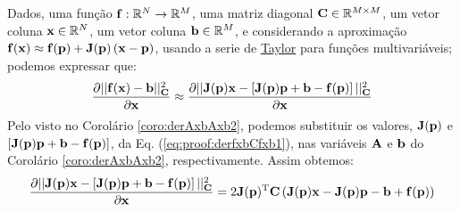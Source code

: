 \begin{myproofT}\label{proof:theo:derfxbCfxb}
Dados,
uma função $\VECTOR{f}:\mathbb{R}^{N} \rightarrow \mathbb{R}^{M}$, 
uma matriz diagonal $\MATRIX{C}\in \mathbb{R}^{M\times M}$, 
um vetor coluna $\VECTOR{x}\in \mathbb{R}^{N}$, 
um vetor coluna $\VECTOR{b}\in \mathbb{R}^{M}$, 
e considerando a aproximação
$\VECTOR{f}(\VECTOR{x})\approx \VECTOR{f}(\VECTOR{p})+\MATRIX{J}(\VECTOR{p})\left(\VECTOR{x}-\VECTOR{p}\right)$,
usando a serie de \hyperref[def:taylor]{Taylor} para funções multivariáveis;
podemos expressar que:
\begin{equation}\label{eq:proof:derfxbCfxb1}
\frac{\partial ||\VECTOR{f}(\VECTOR{x})-\VECTOR{b}||_{\MATRIX{C}}^2}{\partial \VECTOR{x}} \approx
\frac{\partial ||\MATRIX{J}(\VECTOR{p})\VECTOR{x}-\left[\MATRIX{J}(\VECTOR{p})\VECTOR{p}+\VECTOR{b}-\VECTOR{f}(\VECTOR{p})\right]||_{\MATRIX{C}}^2}{\partial \VECTOR{x}}
\end{equation}
Pelo visto no Corolário \ref{coro:derAxbAxb2}, podemos substituir os valores,
$\MATRIX{J}(\VECTOR{p})$ e 
$\left[\MATRIX{J}(\VECTOR{p})\VECTOR{p}+\VECTOR{b}-\VECTOR{f}(\VECTOR{p})\right]$,
da Eq. (\ref{eq:proof:derfxbCfxb1}), nas variáveis $\MATRIX{A}$ e $\VECTOR{b}$ 
do Corolário \ref{coro:derAxbAxb2}, respectivamente. Assim obtemos:
\begin{equation}\label{eq:proof:derfxbCfxb2}
\frac{\partial ||\MATRIX{J}(\VECTOR{p})\VECTOR{x}-\left[\MATRIX{J}(\VECTOR{p})\VECTOR{p}+\VECTOR{b}-\VECTOR{f}(\VECTOR{p})\right]||_{\MATRIX{C}}^2}{\partial \VECTOR{x}}  = 
2 \MATRIX{J}(\VECTOR{p})^{\transpose}\MATRIX{C}\left( \MATRIX{J}(\VECTOR{p})\VECTOR{x}-\MATRIX{J}(\VECTOR{p})\VECTOR{p}-\VECTOR{b}+\VECTOR{f}(\VECTOR{p})\right) 
\end{equation}
\end{myproofT}


